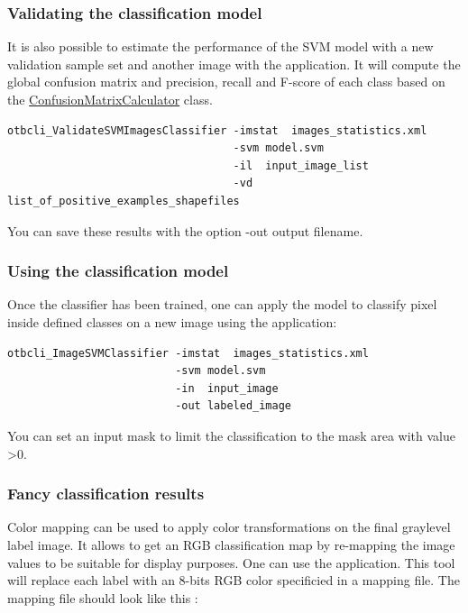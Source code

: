 \subsubsection{Validating the classification model}
It is also possible to estimate the performance of the SVM model with a 
new validation sample set and another image with the 
 application. It will compute 
the global confusion matrix and precision, recall and F-score of each 
class based on the \href{http://www.orfeo-toolbox.org/doxygen-current/classotb_1_1ConfusionMatrixCalculator.html}{ConfusionMatrixCalculator} 
class.

\begin{verbatim}
otbcli_ValidateSVMImagesClassifier -imstat  images_statistics.xml
                                   -svm model.svm
                                   -il  input_image_list
                                   -vd  list_of_positive_examples_shapefiles
\end{verbatim}

You can save these results with the option -out output filename. 

\subsubsection{Using the classification model} 
Once the classifier has been trained, one can apply the model to classify 
pixel inside defined classes on a new image using the 
 application:

\begin{verbatim}
otbcli_ImageSVMClassifier -imstat  images_statistics.xml
                          -svm model.svm 
                          -in  input_image
                          -out labeled_image
\end{verbatim}

You can set an input mask to limit the classification to the mask area with 
value \textgreater 0.

\subsubsection{Fancy classification results}

Color mapping can be used to apply color transformations on the final 
graylevel label image. It allows to get an RGB classification map 
by re-mapping the image values to be suitable for display purposes.
One can use the  application. This tool will 
replace each label with an 8-bits RGB color specificied in a mapping 
file. The mapping file should look like this :

